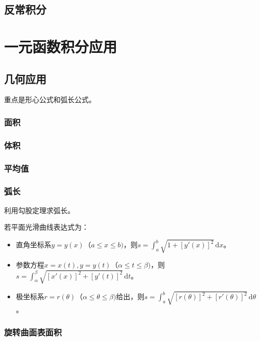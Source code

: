 \documentclass[UTF8, 12pt]{ctexart}
\begin{document}
\subsection{反常积分}

\section{一元函数积分应用}

\subsection{几何应用}

重点是形心公式和弧长公式。

\subsubsection{面积}

\subsubsection{体积}

\subsubsection{平均值}

\subsubsection{弧长}

利用勾股定理求弧长。

若平面光滑曲线表达式为：

\begin{itemize}
    \item 直角坐标系$y=y(x)$（$a\leqslant x\leqslant b)$，则$s=\int_a^b\sqrt{1+[y'(x)]^2}\,\textrm{d}x$。
    \item 参数方程$x=x(t),y=y(t)$（$\alpha\leqslant t\leqslant\beta)$，则$s=\int_\alpha^\beta\sqrt{[x'(x)]^2+[y'(t)]^2}\,\textrm{d}t$。
    \item 极坐标系$r=r(\theta)$（$\alpha\leqslant\theta\leqslant\beta)$给出，则$s=\int_a^b\sqrt{[r(\theta)]^2+[r'(\theta)]^2}\,\textrm{d}\theta$。
\end{itemize}

\subsubsection{旋转曲面表面积}
\end{document}
